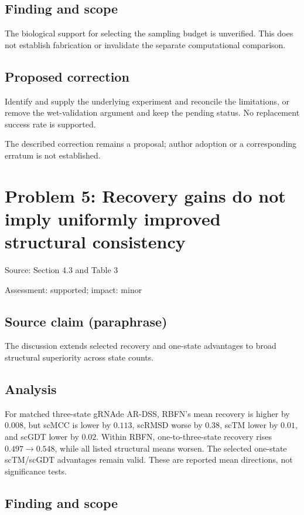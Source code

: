 \documentclass[11pt]{article}
\begin{document}
\subsection*{Finding and scope}

The biological support for selecting the sampling budget is unverified. This does not establish fabrication or invalidate the separate computational comparison.

\subsection*{Proposed correction}

Identify and supply the underlying experiment and reconcile the limitations, or remove the wet-validation argument and keep the pending status. No replacement success rate is supported.

The described correction remains a proposal; author adoption or a corresponding erratum is not established.

\section*{Problem 5: Recovery gains do not imply uniformly improved structural consistency}

Source: Section 4.3 and Table 3

Assessment: supported; impact: minor

\subsection*{Source claim (paraphrase)}

The discussion extends selected recovery and one-state advantages to broad structural superiority across state counts.

\subsection*{Analysis}

For matched three-state gRNAde AR-DSS, RBFN’s mean recovery is higher by \(0.008\), but scMCC is lower by \(0.113\), scRMSD worse by \(0.38\), scTM lower by \(0.01\), and scGDT lower by \(0.02\). Within RBFN, one-to-three-state recovery rises \(0.497\to0.548\), while all listed structural means worsen. The selected one-state scTM/scGDT advantages remain valid. These are reported mean directions, not significance tests.

\subsection*{Finding and scope}
\end{document}
